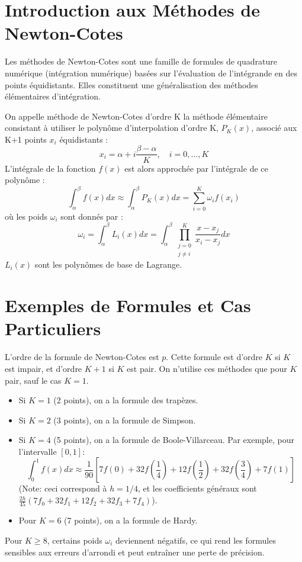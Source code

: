 
\sloppy

\section{Introduction aux Méthodes de Newton-Cotes}
Les méthodes de Newton-Cotes sont une famille de formules de quadrature numérique (intégration numérique) basées sur l'évaluation de l'intégrande en des points équidistants. Elles constituent une généralisation des méthodes élémentaires d'intégration.

\begin{definition}
On appelle méthode de Newton-Cotes d'ordre K la méthode élémentaire consistant à utiliser le polynôme d'interpolation d'ordre K, $P_K(x)$, associé aux K+1 points $x_i$ équidistants :
\[ x_i = \alpha + i \frac{\beta-\alpha}{K}, \quad i=0, \dots, K \]
L'intégrale de la fonction $f(x)$ est alors approchée par l'intégrale de ce polynôme :
\[ \int_{\alpha}^{\beta} f(x) dx \approx \int_{\alpha}^{\beta} P_K(x) dx = \sum_{i=0}^{K} \omega_i f(x_i) \]
où les poids $\omega_i$ sont donnés par :
\[ \omega_i = \int_{\alpha}^{\beta} L_i(x) dx = \int_{\alpha}^{\beta} \prod_{\substack{j=0 \\ j \neq i}}^{K} \frac{x-x_j}{x_i-x_j} dx \]
$L_i(x)$ sont les polynômes de base de Lagrange.
\end{definition}

\section{Exemples de Formules et Cas Particuliers}
L'ordre de la formule de Newton-Cotes est $p$. Cette formule est d'ordre $K$ si $K$ est impair, et d'ordre $K+1$ si $K$ est pair. On n'utilise ces méthodes que pour $K$ pair, sauf le cas $K=1$.

\begin{itemize}
    \item Si $K=1$ (2 points), on a la formule des trapèzes.
    \item Si $K=2$ (3 points), on a la formule de Simpson.
    \item Si $K=4$ (5 points), on a la formule de Boole-Villarceau. Par exemple, pour l'intervalle $[0,1]$:
    \[ \int_0^1 f(x) dx \approx \frac{1}{90} \left[ 7f(0) + 32f\left(\frac{1}{4}\right) + 12f\left(\frac{1}{2}\right) + 32f\left(\frac{3}{4}\right) + 7f(1) \right] \]
    (Note: ceci correspond à $h=1/4$, et les coefficients généraux sont $\frac{2h}{45} (7f_0 + 32f_1 + 12f_2 + 32f_3 + 7f_4)$).
    \item Pour $K=6$ (7 points), on a la formule de Hardy.
\end{itemize}
Pour $K \ge 8$, certains poids $\omega_i$ deviennent négatifs, ce qui rend les formules sensibles aux erreurs d'arrondi et peut entraîner une perte de précision.

